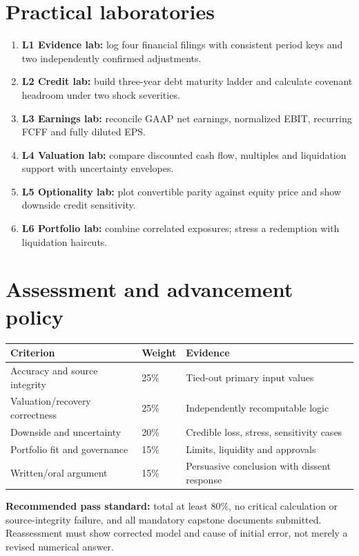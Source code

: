 \documentclass[11pt,letterpaper]{article}
\begin{document}
\section{Practical laboratories}
\begin{enumerate}
\item \textbf{L1 Evidence lab:} log four financial filings with consistent period keys and two independently confirmed adjustments.
\item \textbf{L2 Credit lab:} build three-year debt maturity ladder and calculate covenant headroom under two shock severities.
\item \textbf{L3 Earnings lab:} reconcile GAAP net earnings, normalized EBIT, recurring FCFF and fully diluted EPS.
\item \textbf{L4 Valuation lab:} compare discounted cash flow, multiples and liquidation support with uncertainty envelopes.
\item \textbf{L5 Optionality lab:} plot convertible parity against equity price and show downside credit sensitivity.
\item \textbf{L6 Portfolio lab:} combine correlated exposures; stress a redemption with liquidation haircuts.
\end{enumerate}

\section{Assessment and advancement policy}
\begin{center}\small\begin{tabularx}{\textwidth}{>{\raggedright\arraybackslash}p{}p{}>{\raggedright\arraybackslash}X}\toprule Criterion & Weight & Evidence \\
\midrule Accuracy and source integrity & 25\% & Tied-out primary input values \\
Valuation/recovery correctness & 25\% & Independently recomputable logic \\
Downside and uncertainty & 20\% & Credible loss, stress, sensitivity cases \\
Portfolio fit and governance & 15\% & Limits, liquidity and approvals \\
Written/oral argument & 15\% & Persuasive conclusion with dissent response \\
\bottomrule\end{tabularx}\end{center}
\textbf{Recommended pass standard:} total at least 80\%, no critical calculation or source-integrity failure, and all mandatory capstone documents submitted. Reassessment must show corrected model and cause of initial error, not merely a revised numerical answer.
\end{document}
